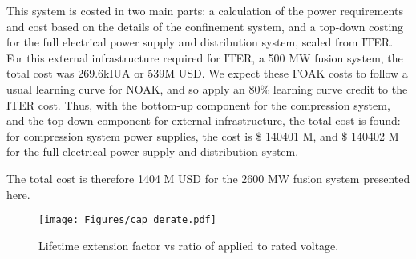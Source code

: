 
This system is costed in two main parts: a calculation of the power requirements and cost based on the details of the confinement system, and a top-down costing for the full electrical power supply and distribution system, scaled from ITER. For this external infrastructure required for ITER, a 500 MW fusion system, the total cost was 269.6kIUA or 539M USD. 
We expect these FOAK costs to follow a usual learning curve for NOAK, and so apply an 80\% learning curve credit to the ITER cost. Thus, with the bottom-up component for the compression system, and the top-down component for external infrastructure, the total cost is found: for compression system power supplies, the cost is \$ 140401 M, and \$ 140402 M for the full electrical power supply and distribution system. 

The total cost is therefore 1404 M USD for the 2600 MW fusion system presented here. 

\begin{figure}[h!]
    \centering
    \texttt{[image: Figures/cap\_derate.pdf]}
    \caption{Lifetime extension factor vs ratio of applied to rated voltage.}
    \label{fig:derate}
\end{figure}




